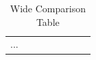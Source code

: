 \begin{landscape}

\begin{table}

\centering

\caption{Wide Comparison Table}

\begin{tabular}{llllllll}

...

\end{tabular}

\end{table}

\end{landscape}